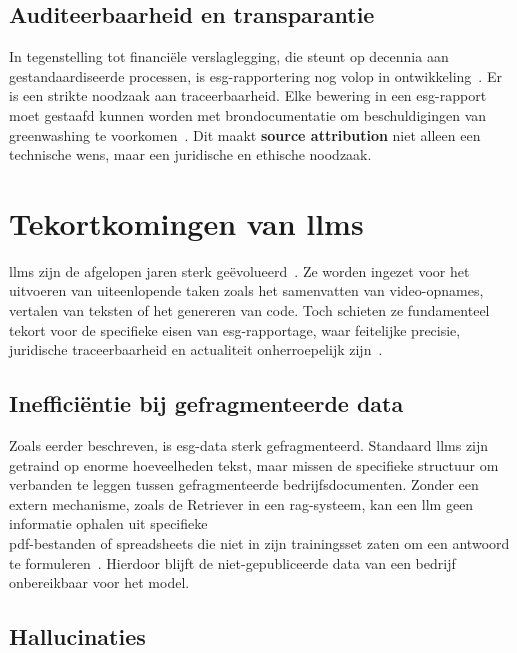 \subsection{Auditeerbaarheid en transparantie}

In tegenstelling tot financiële verslaglegging, die steunt op decennia aan gestandaardiseerde processen, is \gls{esg}-rapportering nog volop in ontwikkeling~\autocite{Yadav2024}. Er is een strikte noodzaak aan traceerbaarheid. Elke bewering in een \gls{esg}-rapport moet gestaafd kunnen worden met brondocumentatie om beschuldigingen van greenwashing te voorkomen~\autocite{Fornasari2024}. Dit maakt \textbf{source attribution} niet alleen een technische wens, maar een juridische en ethische noodzaak.

\section{Tekortkomingen van \glspl{llm}}

\glspl{llm} zijn de afgelopen jaren sterk geëvolueerd~\autocite{Wang2025}. Ze worden ingezet voor het uitvoeren van uiteenlopende taken zoals het samenvatten van video-opnames, vertalen van teksten of het genereren van code. Toch schieten ze fundamenteel tekort voor de specifieke eisen van \gls{esg}-rapportage, waar feitelijke precisie, juridische traceerbaarheid en actualiteit onherroepelijk zijn~\autocite{Alansari2025}.

\subsection{Inefficiëntie bij gefragmenteerde data}

Zoals eerder beschreven, is \gls{esg}-data sterk gefragmenteerd. Standaard \glspl{llm} zijn getraind op enorme hoeveelheden tekst, maar missen de specifieke structuur om verbanden te leggen tussen gefragmenteerde bedrijfsdocumenten. Zonder een extern mechanisme, zoals de Retriever in een \gls{rag}-systeem, kan een \gls{llm} geen informatie ophalen uit specifieke\\\gls{pdf}-bestanden of spreadsheets die niet in zijn trainingsset zaten om een antwoord te formuleren~\autocite{BerniakWozny2025}. Hierdoor blijft de niet-gepubliceerde data van een bedrijf onbereikbaar voor het model.

\subsection{Hallucinaties}


